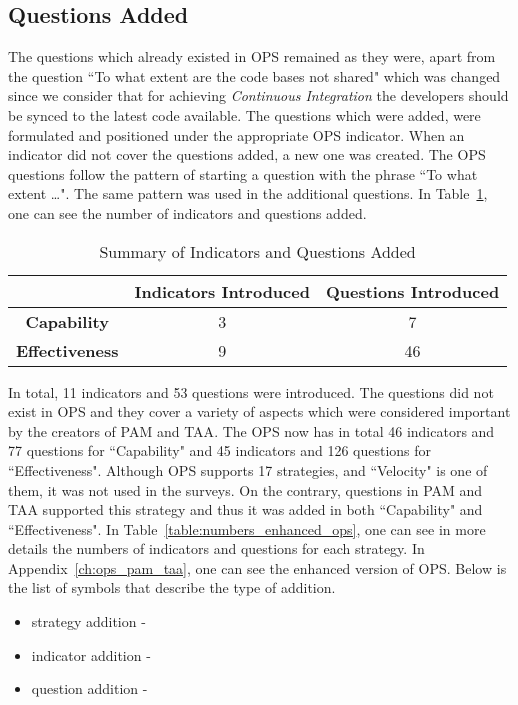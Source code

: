 \subsection{Questions Added}
The questions which already existed in \ac{OPS} remained as they were, apart from the question ``To what extent are the code bases not shared" which was changed since we consider that for achieving \textit{Continuous Integration} the developers should be synced to the latest code available. The questions which were added, were formulated and positioned under the appropriate \ac{OPS} indicator. When an indicator did not cover the questions added, a new one was created. The \ac{OPS} questions follow the pattern of starting a question with the phrase ``To what extent \dots ". The same pattern was used in the additional questions. In Table~\ref{table:summary_questions_added}, one can see the number of indicators and questions added. 

\begin{table} [H]
	\caption{Summary of Indicators and Questions Added}
	\label{table:summary_questions_added}
	\begin{tabular}{| c | c | c |} \hline
		 & \textbf{Indicators Introduced} & \textbf{Questions Introduced} \\ \hline
		 \textbf{Capability} & 3 & 7 \\ \hline
		 \textbf{Effectiveness} & 9 & 46 \\ \hline
	\end{tabular}
\end{table}

In total, 11 indicators and 53 questions were introduced. The questions did not exist in \ac{OPS} and they cover a variety of aspects which were considered important by the creators of \ac{PAM} and \ac{TAA}. The \ac{OPS} now has in total 46 indicators and 77 questions for ``Capability" and 45 indicators and 126 questions for ``Effectiveness". Although \ac{OPS} supports 17 strategies, and ``Velocity" is one of them, it was not used in the surveys. On the contrary, questions in \ac{PAM} and \ac{TAA} supported this strategy and thus it was added in both ``Capability" and ``Effectiveness". In Table~\ref{table:numbers_enhanced_ops}, one can see in more details the numbers of indicators and questions for each strategy. In Appendix~\ref{ch:ops_pam_taa}, one can see the enhanced version of \ac{OPS}. Below is the list of symbols that describe the type of addition.

\begin{itemize}
	\item strategy addition - \TwelweStar
	\item indicator addition - \FiveStarOutline
	\item question addition - \FiveStar
\end{itemize}

